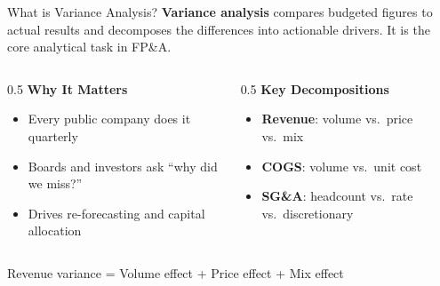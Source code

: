 \documentclass[aspectratio=169]{beamer}
\begin{document}
\begin{frame}{What is Variance Analysis?}
\textbf{Variance analysis} compares \alert{budgeted} figures to \alert{actual} results and decomposes the differences into actionable drivers. It is the core analytical task in FP\&A.
\vspace{0.3cm}
\begin{columns}[T]
\begin{column}{0.5\textwidth}
\textbf{Why It Matters}
\begin{itemize}\small
  \item Every public company does it quarterly
  \item Boards and investors ask ``why did we miss?''
  \item Drives re-forecasting and capital allocation
\end{itemize}
\end{column}
\begin{column}{0.5\textwidth}
\textbf{Key Decompositions}
\begin{itemize}\small
  \item \textbf{Revenue}: volume vs.\ price vs.\ mix
  \item \textbf{COGS}: volume vs.\ unit cost
  \item \textbf{SG\&A}: headcount vs.\ rate vs.\ discretionary
\end{itemize}
\end{column}
\end{columns}
\vspace{0.3cm}
Revenue variance = \alert{Volume effect} + \alert{Price effect} + \alert{Mix effect}
\end{frame}
\end{document}
